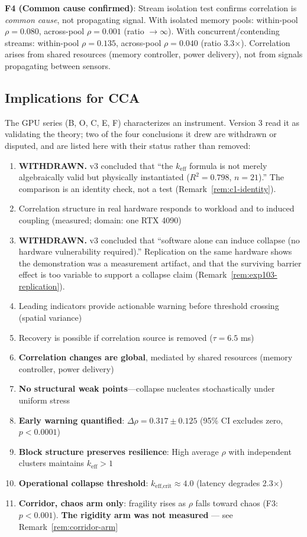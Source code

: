 \documentclass[11pt,a4paper]{article}
\theoremstyle{definition}
\theoremstyle{remark}
\newcommand{\keff}{k_{\text{eff}}}
\begin{document}
\textbf{F4 (Common cause confirmed)}: Stream isolation test confirms correlation is \textit{common cause}, not propagating signal. With isolated memory pools: within-pool $\rho = 0.080$, across-pool $\rho = 0.001$ (ratio $\to \infty$). With concurrent/contending streams: within-pool $\rho = 0.135$, across-pool $\rho = 0.040$ (ratio 3.3$\times$). Correlation arises from shared resources (memory controller, power delivery), not from signals propagating between sensors.

\subsection{Implications for CCA}

The GPU series (B, O, C, E, F) characterizes an instrument. Version 3 read it as validating the theory; two of the four conclusions it drew are withdrawn or disputed, and are listed here with their status rather than removed:

\begin{enumerate}
    \item \textbf{WITHDRAWN.} v3 concluded that ``the $\keff$ formula is not merely algebraically valid but physically instantiated ($R^2 = 0.798$, $n=21$).'' The comparison is an identity check, not a test (Remark~\ref{rem:c1-identity}).
    \item Correlation structure in real hardware responds to workload and to induced coupling (measured; domain: one RTX 4090)
    \item \textbf{WITHDRAWN.} v3 concluded that ``software alone can induce collapse (no hardware vulnerability required).'' Replication on the same hardware shows the demonstration was a measurement artifact, and that the surviving barrier effect is too variable to support a collapse claim (Remark~\ref{rem:exp103-replication}).
    \item Leading indicators provide actionable warning before threshold crossing (spatial variance)
    \item Recovery is possible if correlation source is removed ($\tau = 6.5$ ms)
    \item \textbf{Correlation changes are global}, mediated by shared resources (memory controller, power delivery)
    \item \textbf{No structural weak points}---collapse nucleates stochastically under uniform stress
    \item \textbf{Early warning quantified}: $\Delta\rho = 0.317 \pm 0.125$ (95\% CI excludes zero, $p < 0.0001$)
    \item \textbf{Block structure preserves resilience}: High average $\rho$ with independent clusters maintains $\keff > 1$
    \item \textbf{Operational collapse threshold}: $k_{\text{eff,crit}} \approx 4.0$ (latency degrades 2.3$\times$)
    \item \textbf{Corridor, chaos arm only}: fragility rises as $\rho$ falls toward chaos (F3: $p < 0.001$). \textbf{The rigidity arm was not measured} --- see Remark~\ref{rem:corridor-arm}
\end{enumerate}
\end{document}
